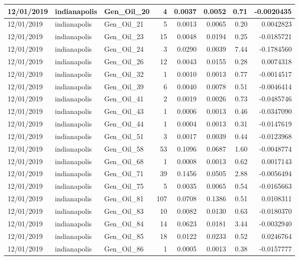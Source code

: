 \documentclass[
  letterpaper,
  DIV=11,
  numbers=noendperiod]{scrartcl}
\begin{document}
\begin{tabular}{l|l|l|r|r|r|r|r}
\hline
12/01/2019 & indianapolis & Gen\_Oil\_20 & 4 & 0.0037 & 0.0052 & 0.71 & -0.0020435\\
\hline
12/01/2019 & indianapolis & Gen\_Oil\_21 & 5 & 0.0013 & 0.0065 & 0.20 & 0.0042823\\
\hline
12/01/2019 & indianapolis & Gen\_Oil\_23 & 15 & 0.0048 & 0.0194 & 0.25 & -0.0185721\\
\hline
12/01/2019 & indianapolis & Gen\_Oil\_24 & 3 & 0.0290 & 0.0039 & 7.44 & -0.1784560\\
\hline
12/01/2019 & indianapolis & Gen\_Oil\_26 & 12 & 0.0043 & 0.0155 & 0.28 & 0.0074318\\
\hline
12/01/2019 & indianapolis & Gen\_Oil\_32 & 1 & 0.0010 & 0.0013 & 0.77 & -0.0014517\\
\hline
12/01/2019 & indianapolis & Gen\_Oil\_39 & 6 & 0.0040 & 0.0078 & 0.51 & -0.0046414\\
\hline
12/01/2019 & indianapolis & Gen\_Oil\_41 & 2 & 0.0019 & 0.0026 & 0.73 & -0.0485746\\
\hline
12/01/2019 & indianapolis & Gen\_Oil\_43 & 1 & 0.0006 & 0.0013 & 0.46 & -0.0347090\\
\hline
12/01/2019 & indianapolis & Gen\_Oil\_44 & 1 & 0.0004 & 0.0013 & 0.31 & -0.0147619\\
\hline
12/01/2019 & indianapolis & Gen\_Oil\_51 & 3 & 0.0017 & 0.0039 & 0.44 & -0.0123968\\
\hline
12/01/2019 & indianapolis & Gen\_Oil\_58 & 53 & 0.1096 & 0.0687 & 1.60 & -0.0048774\\
\hline
12/01/2019 & indianapolis & Gen\_Oil\_68 & 1 & 0.0008 & 0.0013 & 0.62 & 0.0017143\\
\hline
12/01/2019 & indianapolis & Gen\_Oil\_71 & 39 & 0.1456 & 0.0505 & 2.88 & -0.0056494\\
\hline
12/01/2019 & indianapolis & Gen\_Oil\_75 & 5 & 0.0035 & 0.0065 & 0.54 & -0.0165663\\
\hline
12/01/2019 & indianapolis & Gen\_Oil\_81 & 107 & 0.0708 & 0.1386 & 0.51 & 0.0108311\\
\hline
12/01/2019 & indianapolis & Gen\_Oil\_83 & 10 & 0.0082 & 0.0130 & 0.63 & -0.0180370\\
\hline
12/01/2019 & indianapolis & Gen\_Oil\_84 & 14 & 0.0623 & 0.0181 & 3.44 & -0.0032940\\
\hline
12/01/2019 & indianapolis & Gen\_Oil\_85 & 18 & 0.0122 & 0.0233 & 0.52 & 0.0246764\\
\hline
12/01/2019 & indianapolis & Gen\_Oil\_86 & 1 & 0.0005 & 0.0013 & 0.38 & -0.0157777\\

\end{tabular}
\end{document}
